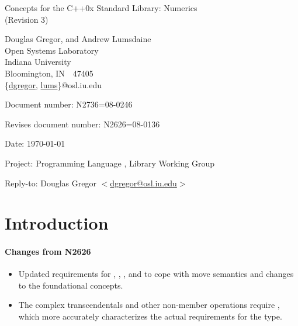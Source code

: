 \documentclass[american,twoside]{book}
\begin{document}
\raggedbottom

\begin{titlepage}
\begin{center}
\huge
Concepts for the C++0x Standard Library: Numerics\\
(Revision 3)

\vspace{0.5in}

\normalsize
Douglas Gregor, and Andrew Lumsdaine \\
Open Systems Laboratory \\
Indiana University \\
Bloomington, IN\ \  47405 \\
\{\href{mailto:dgregor@osl.iu.edu}{dgregor}, \href{mailto:lums@osl.iu.edu}{lums}\}@osl.iu.edu

\end{center}

\vspace{1in}
\par\noindent Document number: N2736=08-0246\vspace{-6pt}
\par\noindent Revises document number: N2626=08-0136\vspace{-6pt}
\par\noindent Date: \today\vspace{-6pt}
\par\noindent Project: Programming Language \Cpp{}, Library Working Group\vspace{-6pt}
\par\noindent Reply-to: Douglas Gregor $<$\href{mailto:dgregor@osl.iu.edu}{dgregor@osl.iu.edu}$>$\vspace{-6pt}

\section*{Introduction}

\paragraph*{Changes from N2626}
\begin{itemize}
\item Updated requirements for ,
  , , and
   to cope with move semantics and changes
  to the foundational concepts.
\item The complex transcendentals and other non-member operations
  require , which more accurately
  characterizes the actual requirements for the  type.
\end{itemize}


\end{titlepage}
\end{document}
